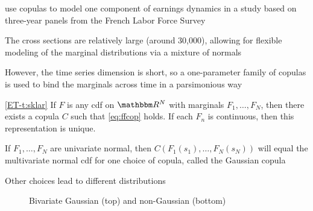 \begin{frame}

    \vspace{2em}
    \Eg
    \cite{bonhomme2009assessing} use copulas to model one component of
    earnings dynamics in a study based on three-year panels from the French
    Labor Force Survey
    
    The cross sections are relatively large (around
    30,000), allowing for flexible modeling of the marginal distributions via
    a mixture of normals
    
    However, the time series dimension is
    short, so a one-parameter family of copulas is used to bind the
    marginals across time in a parsimonious way

\end{frame}

\begin{frame}

    \vspace{2em}
    \Thm\eqref{ET-t:sklar}
        If $F$ is any {\sc cdf} on $\RR^N$ with marginals $F_1, \ldots, F_N$,
        then there exists a copula $C$ such that \eqref{eq:ffcop} holds.  If each
        $F_n$ is continuous, then this representation is unique.
        
\end{frame}

\begin{frame}

    \vspace{2em}
    If $F_1, \ldots, F_N$ are univariate normal, then $C(F_1(s_1), \ldots, F_N(s_N))$
    will equal the multivariate normal {\sc cdf} for one choice of copula,
    called the Gaussian copula
    
    \vspace{2em}
    Other choices lead to different distributions
    
\end{frame}

\begin{frame}
    
    \vspace{2em}
    \begin{figure}
       \centering
       \caption{\label{f:copula} Bivariate Gaussian (top) and non-Gaussian (bottom)}
    \end{figure}
    
\end{frame}

